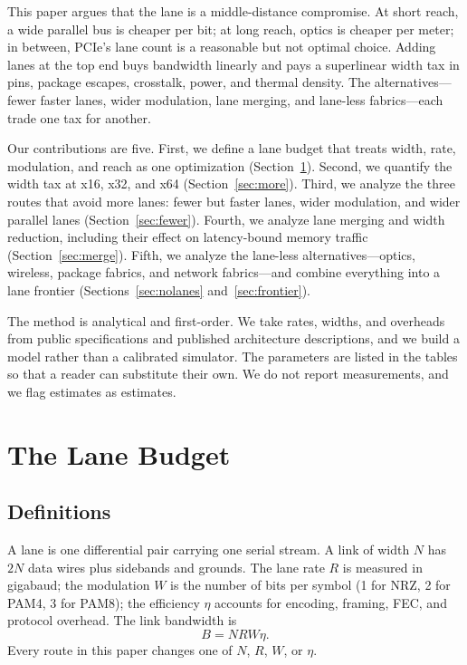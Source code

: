 \documentclass[10pt,letterpaper]{article}
\begin{document}
This paper argues that the lane is a middle-distance compromise. At short reach, a wide parallel bus is cheaper per bit; at long reach, optics is cheaper per meter; in between, PCIe's lane count is a reasonable but not optimal choice. Adding lanes at the top end buys bandwidth linearly and pays a superlinear width tax in pins, package escapes, crosstalk, power, and thermal density. The alternatives---fewer faster lanes, wider modulation, lane merging, and lane-less fabrics---each trade one tax for another.

Our contributions are five. First, we define a lane budget that treats width, rate, modulation, and reach as one optimization (Section~\ref{sec:budget}). Second, we quantify the width tax at x16, x32, and x64 (Section~\ref{sec:more}). Third, we analyze the three routes that avoid more lanes: fewer but faster lanes, wider modulation, and wider parallel lanes (Section~\ref{sec:fewer}). Fourth, we analyze lane merging and width reduction, including their effect on latency-bound memory traffic (Section~\ref{sec:merge}). Fifth, we analyze the lane-less alternatives---optics, wireless, package fabrics, and network fabrics---and combine everything into a lane frontier (Sections~\ref{sec:nolanes} and~\ref{sec:frontier}).

The method is analytical and first-order. We take rates, widths, and overheads from public specifications and published architecture descriptions, and we build a model rather than a calibrated simulator. The parameters are listed in the tables so that a reader can substitute their own. We do not report measurements, and we flag estimates as estimates.

\section{The Lane Budget}
\label{sec:budget}

\subsection{Definitions}

A lane is one differential pair carrying one serial stream. A link of width $N$ has $2N$ data wires plus sidebands and grounds. The lane rate $R$ is measured in gigabaud; the modulation $W$ is the number of bits per symbol (1 for NRZ, 2 for PAM4, 3 for PAM8); the efficiency $\eta$ accounts for encoding, framing, FEC, and protocol overhead. The link bandwidth is
\begin{equation}
B = N R W \eta.
\label{eq:bandwidth}
\end{equation}
Every route in this paper changes one of $N$, $R$, $W$, or $\eta$.
\end{document}
